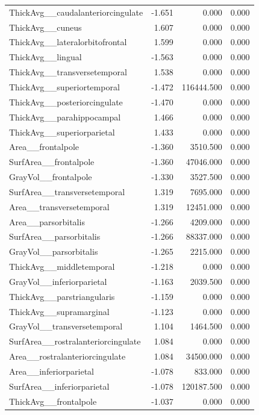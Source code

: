\documentclass{article}
\begin{document}
\begin{longtable}{lrrr}
	ThickAvg\_\_caudalanteriorcingulate & -1.651 & 0.000 & 0.000 \\
	ThickAvg\_\_cuneus & 1.607 & 0.000 & 0.000 \\
	ThickAvg\_\_lateralorbitofrontal & 1.599 & 0.000 & 0.000 \\
	ThickAvg\_\_lingual & -1.563 & 0.000 & 0.000 \\
	ThickAvg\_\_transversetemporal & 1.538 & 0.000 & 0.000 \\
	ThickAvg\_\_superiortemporal & -1.472 & 116444.500 & 0.000 \\
	ThickAvg\_\_posteriorcingulate & -1.470 & 0.000 & 0.000 \\
	ThickAvg\_\_parahippocampal & 1.466 & 0.000 & 0.000 \\
	ThickAvg\_\_superiorparietal & 1.433 & 0.000 & 0.000 \\
	Area\_\_frontalpole & -1.360 & 3510.500 & 0.000 \\
	SurfArea\_\_frontalpole & -1.360 & 47046.000 & 0.000 \\
	GrayVol\_\_frontalpole & -1.330 & 3527.500 & 0.000 \\
	SurfArea\_\_transversetemporal & 1.319 & 7695.000 & 0.000 \\
	Area\_\_transversetemporal & 1.319 & 12451.000 & 0.000 \\
	Area\_\_parsorbitalis & -1.266 & 4209.000 & 0.000 \\
	SurfArea\_\_parsorbitalis & -1.266 & 88337.000 & 0.000 \\
	GrayVol\_\_parsorbitalis & -1.265 & 2215.000 & 0.000 \\
	ThickAvg\_\_middletemporal & -1.218 & 0.000 & 0.000 \\
	GrayVol\_\_inferiorparietal & -1.163 & 2039.500 & 0.000 \\
	ThickAvg\_\_parstriangularis & -1.159 & 0.000 & 0.000 \\
	ThickAvg\_\_supramarginal & -1.123 & 0.000 & 0.000 \\
	GrayVol\_\_transversetemporal & 1.104 & 1464.500 & 0.000 \\
	SurfArea\_\_rostralanteriorcingulate & 1.084 & 0.000 & 0.000 \\
	Area\_\_rostralanteriorcingulate & 1.084 & 34500.000 & 0.000 \\
	Area\_\_inferiorparietal & -1.078 & 833.000 & 0.000 \\
	SurfArea\_\_inferiorparietal & -1.078 & 120187.500 & 0.000 \\
	ThickAvg\_\_frontalpole & -1.037 & 0.000 & 0.000 \\

\end{longtable}
\end{document}
